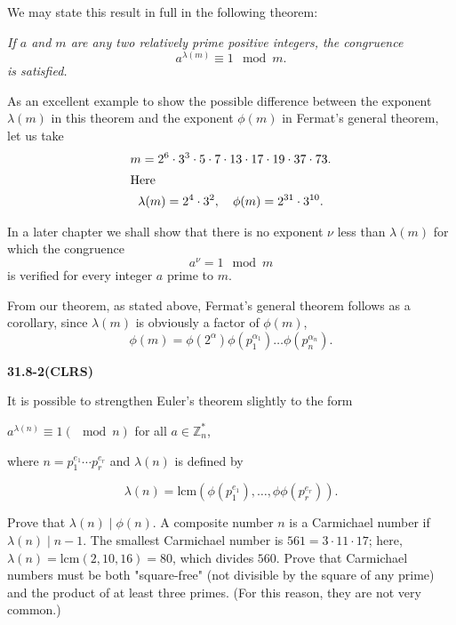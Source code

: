 We may state this result in full in the following theorem:

\smallskip \emph{If $a$ and $m$ are any two relatively prime positive
integers, the congruence}
\begin{equation*}
a^{\lambda(m)} \equiv 1 \mod m.
\end{equation*}
\emph{is satisfied.}

As an excellent example to show the possible difference between the
exponent $\lambda(m)$ in this theorem and the exponent $\phi(m)$ in
Fermat's general theorem, let us take
\begin{gather*}
m = 2^6 \cdot 3^3 \cdot 5 \cdot 7 \cdot 13 \cdot 17 \cdot 19
        \cdot 37 \cdot 73. \\
\intertext{Here}
\lambda(m) = 2^4 \cdot 3^2, \quad \phi(m) = 2^{31} \cdot 3^{10}.
\end{gather*}

In a later chapter we shall show that there is no exponent $\nu$
less than $\lambda(m)$ for which the congruence
\begin{equation*}
a^\nu = 1 \mod m
\end{equation*}
is verified for every integer $a$ prime to $m$.

From our theorem, as stated above, Fermat's general theorem follows
as a corollary, since $\lambda(m)$ is obviously a factor of
$\phi(m)$,
\begin{equation*}
\phi(m) = \phi(2^\alpha) \phi(p_1^{\alpha_1}) \ldots
               \phi(p_n^{\alpha_n}).
\end{equation*}




    

\textbf{31.8-2(CLRS)}

It is possible to strengthen Euler's theorem slightly to the form

$a^{\lambda(n)} \equiv 1 (\mod n)$ for all $a \in \mathbb Z_n^*$,

where $n = p_1^{e_1} \cdots p_r^{e_r}$ and $\lambda(n)$ is defined by

$$\lambda(n) = \text{lcm}(\phi(p_1^{e_1}), \ldots, \phi\phi(p_r^{e_r})). $$

Prove that $\lambda(n) \mid \phi(n)$. A composite number $n$ is a Carmichael number if $\lambda(n) \mid n - 1$. The smallest Carmichael number is $561 = 3 \cdot 11 \cdot 17$; here, $\lambda(n) = \text{lcm}(2, 10, 16) = 80$, which divides $560$. Prove that Carmichael numbers must be both "square-free" (not divisible by the square of any prime) and the product of at least three primes. (For this reason, they are not very common.)

